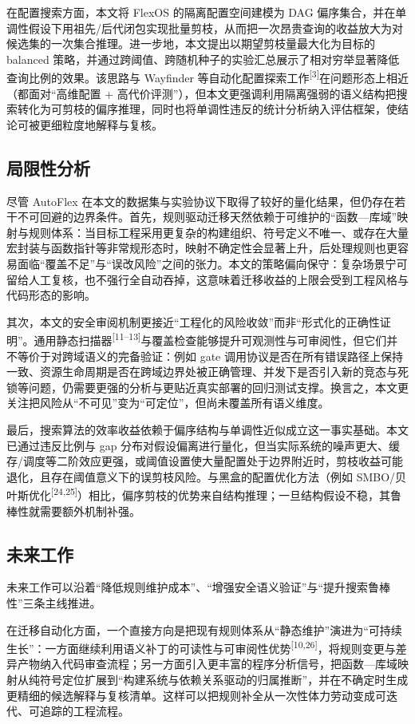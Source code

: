 \documentclass[UTF8,a4paper,12pt]{ctexart}
\numberwithin{equation}{section}
\begin{document}
在配置搜索方面，本文将 FlexOS 的隔离配置空间建模为 DAG 偏序集合，并在单调性假设下用祖先/后代闭包实现批量剪枝，从而把一次昂贵查询的收益放大为对候选集的一次集合推理。进一步地，本文提出以期望剪枝量最大化为目标的 balanced 策略，并通过跨阈值、跨随机种子的实验汇总展示了相对穷举显著降低查询比例的效果。该思路与 Wayfinder 等自动化配置探索工作\textsuperscript{[3]}在问题形态上相近（都面对``高维配置 + 高代价评测''），但本文更强调利用隔离强弱的语义结构把搜索转化为可剪枝的偏序推理，同时也将单调性违反的统计分析纳入评估框架，使结论可被更细粒度地解释与复核。

\subsection{局限性分析}

尽管 AutoFlex 在本文的数据集与实验协议下取得了较好的量化结果，但仍存在若干不可回避的边界条件。首先，规则驱动迁移天然依赖于可维护的``函数---库域''映射与规则体系：当目标工程采用更复杂的构建组织、符号定义不唯一、或存在大量宏封装与函数指针等非常规形态时，映射不确定性会显著上升，后处理规则也更容易面临``覆盖不足''与``误改风险''之间的张力。本文的策略偏向保守：复杂场景宁可留给人工复核，也不强行全自动吞掉，这意味着迁移收益的上限会受到工程风格与代码形态的影响。

其次，本文的安全审阅机制更接近``工程化的风险收敛''而非``形式化的正确性证明''。通用静态扫描器\textsuperscript{[11--13]}与覆盖检查能够提升可观测性与可审阅性，但它们并不等价于对跨域语义的完备验证：例如 gate 调用协议是否在所有错误路径上保持一致、资源生命周期是否在跨域边界处被正确管理、并发下是否引入新的竞态与死锁等问题，仍需要更强的分析与更贴近真实部署的回归测试支撑。换言之，本文更关注把风险从``不可见''变为``可定位''，但尚未覆盖所有语义维度。

最后，搜索算法的效率收益依赖于偏序结构与单调性近似成立这一事实基础。本文已通过违反比例与 gap 分布对假设偏离进行量化，但当实际系统的噪声更大、缓存/调度等二阶效应更强，或阈值设置使大量配置处于边界附近时，剪枝收益可能退化，且存在阈值意义下的误剪枝风险。与黑盒的配置优化方法（例如 SMBO/贝叶斯优化\textsuperscript{[24,25]}）相比，偏序剪枝的优势来自结构推理；一旦结构假设不稳，其鲁棒性就需要额外机制补强。

\subsection{未来工作}

未来工作可以沿着``降低规则维护成本''、``增强安全语义验证''与``提升搜索鲁棒性''三条主线推进。

在迁移自动化方面，一个直接方向是把现有规则体系从``静态维护''演进为``可持续生长''：一方面继续利用语义补丁的可读性与可审阅性优势\textsuperscript{[10,26]}，将规则变更与差异产物纳入代码审查流程；另一方面引入更丰富的程序分析信号，把函数---库域映射从纯符号定位扩展到``构建系统与依赖关系驱动的归属推断''，并在不确定时生成更精细的候选解释与复核清单。这样可以把规则补全从一次性体力劳动变成可迭代、可追踪的工程流程。
\end{document}
